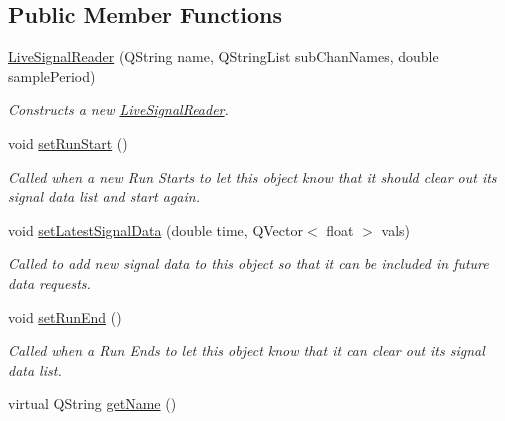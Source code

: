 \subsection*{Public Member Functions}
\begin{DoxyCompactItemize}
\item 
\hyperlink{class_picto_1_1_live_signal_reader_a26231054a01a62062b44dc3e741ba55e}{Live\-Signal\-Reader} (Q\-String name, Q\-String\-List sub\-Chan\-Names, double sample\-Period)
\begin{DoxyCompactList}\small\item\em Constructs a new \hyperlink{class_picto_1_1_live_signal_reader}{Live\-Signal\-Reader}. \end{DoxyCompactList}\item 
\hypertarget{class_picto_1_1_live_signal_reader_a63f6f3bffe5203ebd60acfbd444ccc0c}{void \hyperlink{class_picto_1_1_live_signal_reader_a63f6f3bffe5203ebd60acfbd444ccc0c}{set\-Run\-Start} ()}\label{class_picto_1_1_live_signal_reader_a63f6f3bffe5203ebd60acfbd444ccc0c}

\begin{DoxyCompactList}\small\item\em Called when a new Run Starts to let this object know that it should clear out its signal data list and start again. \end{DoxyCompactList}\item 
void \hyperlink{class_picto_1_1_live_signal_reader_a45c4f89c02ea841e85911f4aa3574925}{set\-Latest\-Signal\-Data} (double time, Q\-Vector$<$ float $>$ vals)
\begin{DoxyCompactList}\small\item\em Called to add new signal data to this object so that it can be included in future data requests. \end{DoxyCompactList}\item 
\hypertarget{class_picto_1_1_live_signal_reader_a52867250cbbecb7447b15b69820af926}{void \hyperlink{class_picto_1_1_live_signal_reader_a52867250cbbecb7447b15b69820af926}{set\-Run\-End} ()}\label{class_picto_1_1_live_signal_reader_a52867250cbbecb7447b15b69820af926}

\begin{DoxyCompactList}\small\item\em Called when a Run Ends to let this object know that it can clear out its signal data list. \end{DoxyCompactList}\item 
\hypertarget{class_picto_1_1_live_signal_reader_a50cd6f10ff044e60b7a496ea8a0f5ea3}{virtual Q\-String \hyperlink{class_picto_1_1_live_signal_reader_a50cd6f10ff044e60b7a496ea8a0f5ea3}{get\-Name} ()}\label{class_picto_1_1_live_signal_reader_a50cd6f10ff044e60b7a496ea8a0f5ea3}


\end{DoxyCompactItemize}
